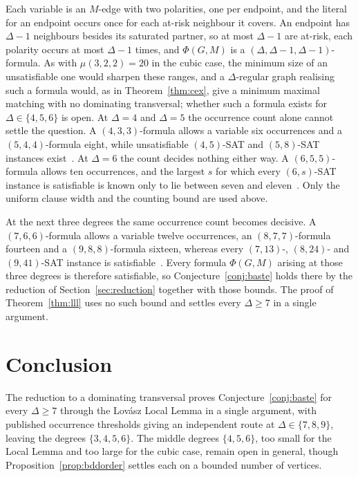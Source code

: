 \documentclass[11pt]{article}
\theoremstyle{definition}
\theoremstyle{remark}
\begin{document}
\noindent
Each variable is an $M$-edge with two polarities, one per endpoint, and the
literal for an endpoint occurs once for each at-risk neighbour it covers. An
endpoint has $\Delta - 1$ neighbours besides its saturated partner, so at most
$\Delta - 1$ are at-risk, each polarity occurs at most $\Delta - 1$ times, and
$\Phi(G,M)$ is a $(\Delta, \Delta-1, \Delta-1)$-formula. As with $\mu(3,2,2) = 20$
in the cubic case, the minimum size of an unsatisfiable one would sharpen these
ranges, and a
$\Delta$-regular graph realising such a formula would, as in
Theorem~\ref{thm:cex}, give a minimum maximal matching with no dominating
transversal; whether such a formula exists for $\Delta \in \{4, 5, 6\}$ is open. At $\Delta
= 4$ and $\Delta = 5$ the occurrence count alone cannot settle the question. A
$(4,3,3)$-formula allows a variable six occurrences and a $(5,4,4)$-formula
eight, while unsatisfiable $(4,5)$-SAT and $(5,8)$-SAT instances
exist~\cite{HoorySzeider2005}. At
$\Delta = 6$ the count decides nothing either way. A $(6,5,5)$-formula allows ten
occurrences, and the largest $s$ for which every $(6,s)$-SAT instance is
satisfiable is known only to lie between seven and
eleven~\cite{HoorySzeider2005}. Only the
uniform clause width and the counting bound are used above.

\medskip\noindent
At the next three degrees the same occurrence count becomes decisive. A $(7,6,6)$-formula allows a
variable twelve occurrences, an $(8,7,7)$-formula fourteen and a $(9,8,8)$-formula
sixteen, whereas every $(7,13)$-, $(8,24)$- and $(9,41)$-SAT instance is
satisfiable~\cite{HoorySzeider2005}. Every formula $\Phi(G,M)$ arising at those
three degrees is therefore satisfiable, so Conjecture~\ref{conj:baste} holds
there by the reduction of Section~\ref{sec:reduction} together with those
bounds. The proof of Theorem~\ref{thm:lll} uses no such bound and settles
every $\Delta \ge 7$ in a single argument.

\section{Conclusion}\label{sec:open}

The reduction to a dominating transversal proves Conjecture~\ref{conj:baste} for
every $\Delta \ge 7$ through the Lov\'asz Local Lemma in a single argument, with
published occurrence thresholds giving an independent route at $\Delta \in
\{7,8,9\}$, leaving the degrees $\{3,4,5,6\}$. The middle degrees $\{4,5,6\}$, too small
for the Local Lemma and too large for the cubic case, remain open in general,
though Proposition~\ref{prop:bddorder} settles each on a bounded number of
vertices.
\end{document}
